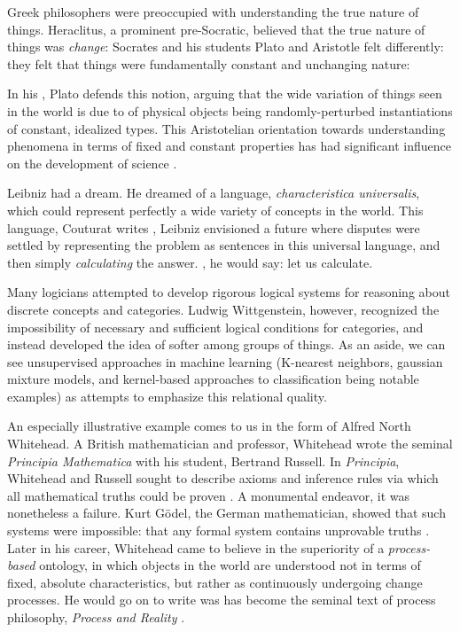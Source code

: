 \bigskip

Greek philosophers were preoccupied with understanding the true nature of things.
Heraclitus, a prominent pre-Socratic, believed that the true nature of things was \textit{change}: 
Socrates and his students Plato and Aristotle felt differently: they felt that things were fundamentally constant and unchanging nature: 

In his , Plato defends this notion, arguing that the wide variation of things seen in the world is due to of physical objects being randomly-perturbed instantiations of constant, idealized types.
This Aristotelian orientation towards understanding phenomena in terms of fixed and constant properties has had significant influence on the development of science \cite{pirsig}.

\bigskip

Leibniz had a dream.
He dreamed of a language, \textit{characteristica universalis}, which could represent perfectly a wide variety of concepts in the world.
This language, Couturat writes \cite{couturat}, 
Leibniz envisioned a future where disputes were settled by representing the problem as sentences in this universal language, and then simply \textit{calculating} the answer.
, he would say: let us calculate.

Many logicians attempted to develop rigorous logical systems for reasoning about discrete concepts and categories.
Ludwig Wittgenstein, however, recognized the impossibility of necessary and sufficient logical conditions for categories, and instead developed the idea of softer  among groups of things.
As an aside, we can see unsupervised approaches in machine learning (K-nearest neighbors, gaussian mixture models, and kernel-based approaches to classification being notable examples) as attempts to emphasize this relational quality.

\bigskip

An especially illustrative example comes to us in the form of Alfred North Whitehead.
A British mathematician and professor, Whitehead wrote the seminal \textit{Principia Mathematica} with his student, Bertrand Russell.
In \textit{Principia}, Whitehead and Russell sought to describe axioms and inference rules via which all mathematical truths could be proven \cite{doxiadis}.
A monumental endeavor, it was nonetheless a failure.
Kurt G{\"o}del, the German mathematician, showed that such systems were impossible: that any formal system contains unprovable truths \cite{hofstadter}.
Later in his career, Whitehead came to believe in the superiority of a \textit{process-based} ontology, in which objects in the world are understood not in terms of fixed, absolute characteristics, but rather as continuously undergoing change processes.
He would go on to write was has become the seminal text of process philosophy, \textit{Process and Reality} \cite{whitehead}.

